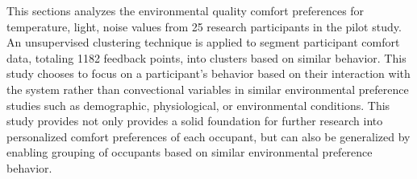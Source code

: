\documentclass[]{interact}
\theoremstyle{plain}%
\theoremstyle{definition}
\theoremstyle{remark}
\begin{document}

This sections analyzes the environmental quality comfort preferences for temperature, light, noise values from 25 research participants in the pilot study. An unsupervised clustering technique is applied to segment participant comfort data, totaling 1182 feedback points, into clusters based on similar behavior.  This study chooses to focus on a participant's behavior based on their interaction with the system rather than convectional variables in similar environmental preference studies such as demographic, physiological, or environmental conditions. This study provides not only provides a solid foundation for further research into personalized comfort preferences of each occupant, but can also be generalized by enabling grouping of occupants based on similar environmental preference behavior.



\end{document}
